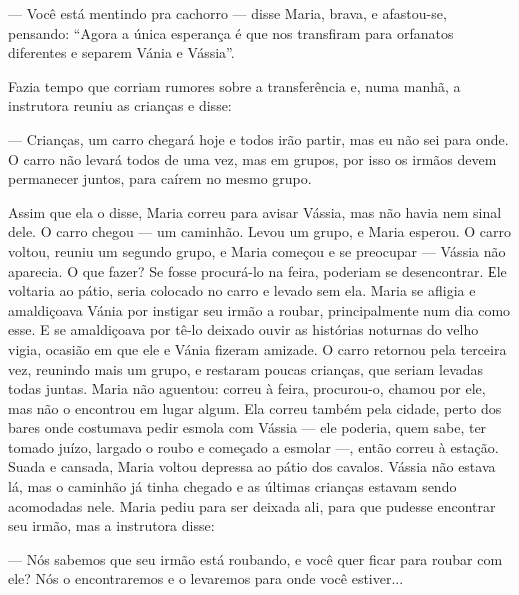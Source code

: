 --- Você está mentindo pra cachorro --- disse Maria, brava, e
afastou-se, pensando: ``Agora a única esperança é que nos transfiram
para orfanatos diferentes e separem Vánia e Vássia''.

Fazia tempo que corriam rumores sobre a transferência e, numa manhã, a
instrutora reuniu as crianças e disse:

--- Crianças, um carro chegará hoje e todos irão partir, mas eu não sei
para onde. O carro não levará todos de uma vez, mas em grupos, por isso
os irmãos devem permanecer juntos, para caírem no mesmo grupo.

Assim que ela o disse, Maria correu para avisar Vássia, mas não havia
nem sinal dele. O carro chegou --- um caminhão. Levou um grupo, e Maria
esperou. O carro voltou, reuniu um segundo grupo, e Maria começou e se
preocupar --- Vássia não aparecia. O que fazer? Se fosse procurá-lo na
feira, poderiam se desencontrar. Еle voltaria ao pátio, seria colocado
no carro e levado sem ela. Maria se afligia e amaldiçoava Vánia por
instigar seu irmão a roubar, principalmente num dia como esse. E se
amaldiçoava por tê-lo deixado ouvir as histórias noturnas do velho
vigia, ocasião em que ele e Vánia fizeram amizade. O carro retornou pela
terceira vez, reunindo mais um grupo, e restaram poucas crianças, que
seriam levadas todas juntas. Maria não aguentou: correu à feira,
procurou-o, chamou por ele, mas não o encontrou em lugar algum. Ela
correu também pela cidade, perto dos bares onde costumava pedir esmola
com Vássia --- ele poderia, quem sabe, ter tomado juízo, largado o roubo
e começado a esmolar ---, então correu à estação. Suada e cansada, Maria
voltou depressa ao pátio dos cavalos. Vássia não estava lá, mas o
caminhão já tinha chegado e as últimas crianças estavam sendo acomodadas
nele. Maria pediu para ser deixada ali, para que pudesse encontrar seu
irmão, mas a instrutora disse:

--- Nós sabemos que seu irmão está roubando, e você quer ficar para
roubar com ele? Nós o encontraremos e o levaremos para onde você
estiver...

